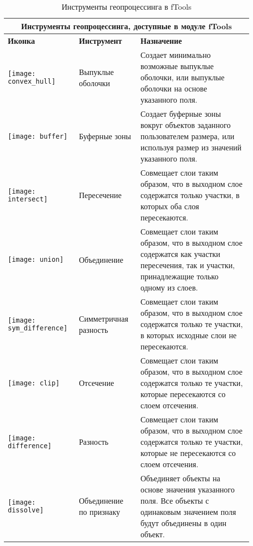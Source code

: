 \begin{table}[ht]
\centering
 \begin{tabular}{|m{1cm}|m{4cm}|m{9cm}|}
 \hline \multicolumn{3}{|c|}{\textbf{Инструменты геопроцессинга, доступные в  модуле fTools}} \\
 \hline \textbf{Иконка} & \textbf{Инструмент} & \textbf{Назначение} \\
 \hline \texttt{[image: convex\_hull]} & Выпуклые оболочки & Создает
 минимально возможные выпуклые оболочки, или выпуклые оболочки
 на основе указанного поля. \\
 \hline \texttt{[image: buffer]} & Буферные зоны & Создает
 буферные зоны вокруг объектов заданного пользователем размера, или используя
 размер из значений указанного поля. \\
 \hline \texttt{[image: intersect]} & Пересечение & Совмещает
 слои таким образом, что в выходном слое содержатся только участки, в которых оба слоя пересекаются. \\
 \hline \texttt{[image: union]} & Объединение & Совмещает
 слои таким образом, что в выходном слое содержатся как участки
 пересечения, так и участки, принадлежащие только одному из слоев. \\
 \hline \texttt{[image: sym\_difference]} & Симметричная разность &
 Совмещает слои таким образом, что в выходном слое содержатся
 только те участки, в которых исходные слои не пересекаются. \\
 \hline \texttt{[image: clip]} & Отсечение & Совмещает слои
 таким образом, что в выходном слое содержатся только те участки,
 которые пересекаются со слоем отсечения. \\
 \hline \texttt{[image: difference]} & Разность & Совмещает
 слои таким образом, что в выходном слое содержатся только те участки,
 которые не пересекаются со слоем отсечения. \\
 \hline \texttt{[image: dissolve]} & Объединение по признаку & Объединяет
 объекты на основе значения указанного поля. Все объекты с одинаковым значением поля
 будут объединены в один объект. \\
 \hline
\end{tabular}
\caption{Инструменты геопроцессинга в fTools}\label{tab:ftool_geoprocessing}
\end{table}

